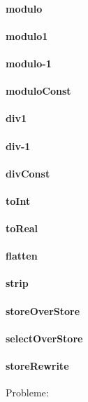 \documentclass[a4paper]{article}
\begin{document}
\paragraph{modulo}
\paragraph{modulo1}
\paragraph{modulo-1}
\paragraph{moduloConst}
\paragraph{div1}
\paragraph{div-1}
\paragraph{divConst}
\paragraph{toInt}
\paragraph{toReal}
\paragraph{flatten}
\paragraph{strip}
\paragraph{storeOverStore}
\paragraph{selectOverStore}
\paragraph{storeRewrite}

Probleme:
\end{document}
